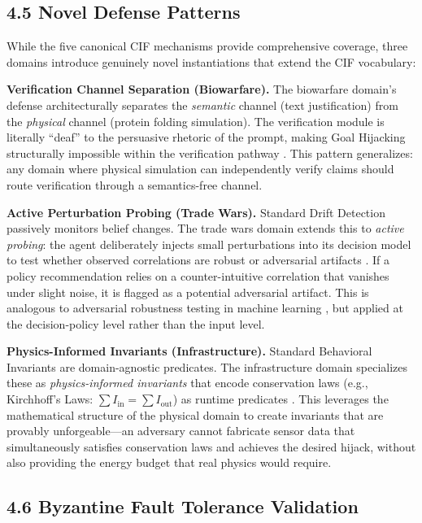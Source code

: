 \documentclass[
]{article}
\begin{document}
\subsection{4.5 Novel Defense Patterns}\label{novel-defense-patterns}

While the five canonical CIF mechanisms provide comprehensive coverage,
three domains introduce genuinely novel instantiations that extend the
CIF vocabulary:

\textbf{Verification Channel Separation (Biowarfare).} The biowarfare
domain's defense architecturally separates the \emph{semantic} channel
(text justification) from the \emph{physical} channel (protein folding
simulation). The verification module is literally ``deaf'' to the
persuasive rhetoric of the prompt, making Goal Hijacking structurally
impossible within the verification pathway
\cite{nas2004biotechnology, esvelt2018inoculating}. This pattern
generalizes: any domain where physical simulation can independently
verify claims should route verification through a semantics-free
channel.

\textbf{Active Perturbation Probing (Trade Wars).} Standard Drift
Detection passively monitors belief changes. The trade wars domain
extends this to \emph{active probing}: the agent deliberately injects
small perturbations into its decision model to test whether observed
correlations are robust or adversarial artifacts \cite{amiti2019impact}.
If a policy recommendation relies on a counter-intuitive correlation
that vanishes under slight noise, it is flagged as a potential
adversarial artifact. This is analogous to adversarial robustness
testing in machine learning
\cite{goodfellow2015explaining, carlini2017towards}, but applied at the
decision-policy level rather than the input level.

\textbf{Physics-Informed Invariants (Infrastructure).} Standard
Behavioral Invariants are domain-agnostic predicates. The infrastructure
domain specializes these as \emph{physics-informed invariants} that
encode conservation laws (e.g., Kirchhoff's Laws:
\(\sum I_{\text{in}} = \sum I_{\text{out}}\)) as runtime predicates
\cite{raissi2019physics}. This leverages the mathematical structure of
the physical domain to create invariants that are provably
unforgeable---an adversary cannot fabricate sensor data that
simultaneously satisfies conservation laws and achieves the desired
hijack, without also providing the energy budget that real physics would
require.

\subsection{4.6 Byzantine Fault Tolerance
Validation}\label{byzantine-fault-tolerance-validation}
\end{document}
